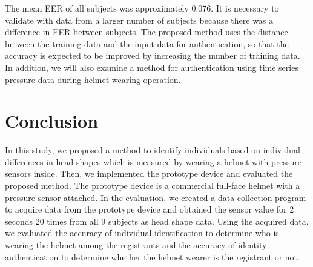 \documentclass[sigchi,authordraft]{acmart}
\begin{document}

The mean EER of all subjects was approximately 0.076. It is necessary to validate with data from a larger number of subjects because there was a difference in EER between subjects. The proposed method uses the distance between the training data and the input data for authentication, so that the accuracy is expected to be improved by increasing the number of training data. In addition, we will also examine a method for authentication using time series pressure data during helmet wearing operation.


\section{Conclusion}
\label{sec:conclusion}
In this study, we proposed a method to identify individuals based on individual differences in head shapes which is measured by wearing a helmet with pressure sensors inside. Then, we implemented the prototype device and evaluated the proposed method. The prototype device is a commercial full-face helmet with a pressure sensor attached. In the evaluation, we created a data collection program to acquire data from the prototype device and obtained the sensor value for 2 seconds 20 times from all 9 subjects as head shape data. Using the acquired data, we evaluated the accuracy of individual identification to determine who is wearing the helmet among the registrants and the accuracy of identity authentication to determine whether the helmet wearer is the registrant or not.\par
\end{document}
